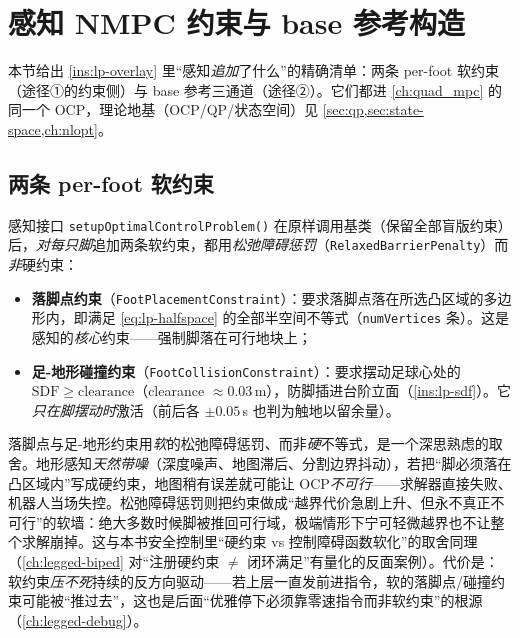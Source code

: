 \section{感知 NMPC 约束与 base 参考构造}
\label{sec:lp-constraint}

本节给出 \cref{ins:lp-overlay} 里“感知\emph{追加}了什么”的精确清单：两条 per-foot 软约束（途径①的约束侧）与 base 参考三通道（途径②）。它们都进 \cref{ch:quad_mpc} 的同一个 OCP，理论地基（OCP/QP/状态空间）见 \cref{sec:qp,sec:state-space,ch:nlopt}。

\subsection{两条 per-foot 软约束}
\label{subsec:lp-soft}

感知接口 \texttt{setupOptimalControlProblem()} 在原样调用基类（保留全部盲版约束）后，\emph{对每只脚}追加两条软约束，都用\emph{松弛障碍惩罚}（\texttt{RelaxedBarrierPenalty}）而\emph{非}硬约束：

\begin{itemize}
  \item \textbf{落脚点约束}（\texttt{FootPlacementConstraint}）：要求落脚点落在所选凸区域的多边形内，即满足 \cref{eq:lp-halfspace} 的全部半空间不等式（\texttt{numVertices} 条）。这是感知的\emph{核心}约束——强制脚落在可行地块上；
  \item \textbf{足-地形碰撞约束}（\texttt{FootCollisionConstraint}）：要求摆动足球心处的 $\mathrm{SDF}\ge \text{clearance}$（clearance $\approx 0.03\,$m），防脚插进台阶立面（\cref{ins:lp-sdf}）。它\emph{只在脚摆动时}激活（前后各 $\pm 0.05\,$s 也判为触地以留余量）。
\end{itemize}

\begin{insight}\label{ins:lp-soft-why}
落脚点与足-地形约束用\emph{软}的松弛障碍惩罚、而非\emph{硬}不等式，是一个深思熟虑的取舍。地形感知\emph{天然带噪}（深度噪声、地图滞后、分割边界抖动），若把“脚必须落在凸区域内”写成硬约束，地图稍有误差就可能让 OCP\emph{不可行}——求解器直接失败、机器人当场失控。松弛障碍惩罚则把约束做成“越界代价急剧上升、但永不真正不可行”的软墙：绝大多数时候脚被推回可行域，极端情形下宁可轻微越界也不让整个求解崩掉。这与本书安全控制里“硬约束 vs 控制障碍函数软化”的取舍同理（\cref{ch:legged-biped} 对“注册硬约束 $\ne$ 闭环满足”有量化的反面案例）。代价是：软约束\emph{压不死}持续的反方向驱动——若上层一直发前进指令，软的落脚点/碰撞约束可能被“推过去”，这也是后面“优雅停下必须靠零速指令而非软约束”的根源（\cref{ch:legged-debug}）。
\end{insight}

